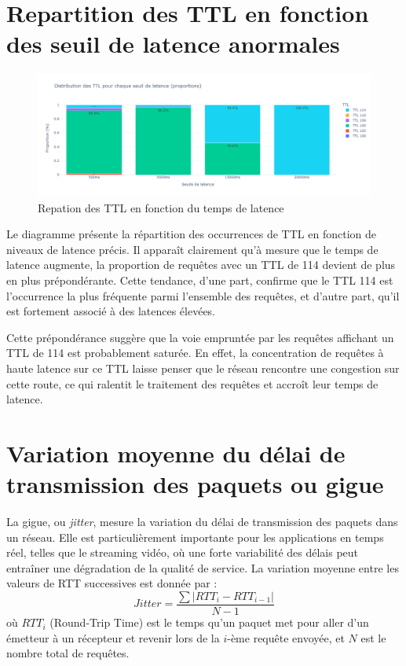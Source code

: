\section{Repartition des TTL en fonction des seuil de latence anormales}
\begin{figure}[H]	
	\centering 
	\caption{Repation des TTL en fonction du temps de latence}
	\includegraphics[width=1.05\textwidth, keepaspectratio]{Images/ttl.png}
\end{figure}
Le diagramme présente la répartition des occurrences de TTL en fonction de niveaux de 
latence précis. Il apparaît clairement qu’à mesure que le temps de latence augmente, la 
proportion de requêtes avec un TTL de 114 devient de plus en plus prépondérante. Cette 
tendance, d’une part, confirme que le TTL 114 est l’occurrence la plus fréquente parmi 
l’ensemble des requêtes, et d’autre part, qu’il est fortement associé à des latences élevées.

Cette prépondérance suggère que la voie empruntée par les requêtes affichant un TTL de 114 
est probablement saturée. En effet, la concentration de requêtes à haute latence sur ce TTL 
laisse penser que le réseau rencontre une congestion sur cette route, ce qui ralentit le 
traitement des requêtes et accroît leur temps de latence.



\section{Variation moyenne  du délai de transmission des paquets ou gigue}
La gigue, ou \textit{jitter}, mesure la variation du délai de transmission des paquets dans un réseau. Elle est particulièrement importante pour les applications en temps réel, telles que le streaming vidéo, où une forte variabilité des délais peut entraîner une dégradation de la qualité de service.
La variation moyenne entre les valeurs de RTT successives est donnée par :
\begin{equation}
	Jitter = \frac{\sum |RTT_i - RTT_{i-1}|}{N-1}
\end{equation}
où \( RTT_i \) (Round-Trip Time) est le temps qu'un paquet met pour aller d'un émetteur à un récepteur et revenir lors de la \( i \)-ème requête envoyée, et \( N \) est le nombre total de requêtes.

